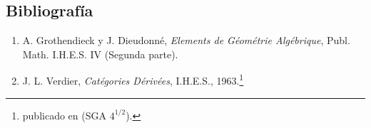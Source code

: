 \subsection*{Bibliografía}

\begin{enumerate}
\item[{[1]}] A. Grothendieck y J. Dieudonné, \emph{Elements de Géométrie Algébrique}, Publ. Math. I.H.E.S. IV (Segunda parte).
\item[{[2]}] J. L. Verdier, \emph{Catégories Dérivées}, I.H.E.S., 1963.\footnote{publicado en (SGA $4^{1/2}$).}
\end{enumerate}

